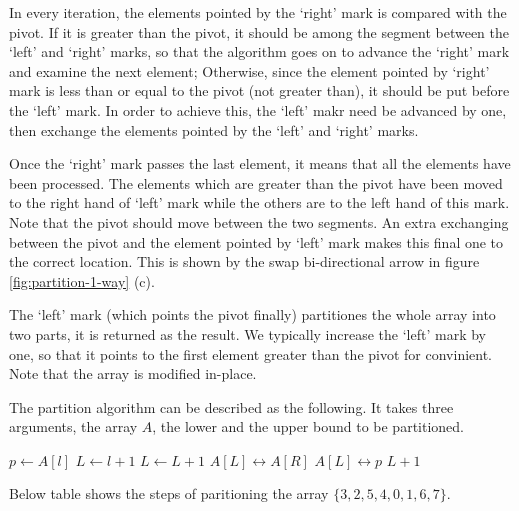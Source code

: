 \documentclass{article}
\begin{document}
In every iteration, the elements pointed by the `right' mark is compared with the
pivot. If it is greater than the pivot, it should be among the segment between the `left' and `right' marks, so that
the algorithm goes on to advance the `right' mark and examine the next element; Otherwise, since the element pointed
by `right' mark is less than or equal to the pivot (not greater than), it should be put before the `left' mark.
In order to achieve this, the `left' makr need be advanced by one, then exchange the elements pointed by the `left' 
and `right' marks.

Once the `right' mark passes the last element, it means that all the elements have been processed. The elements 
which are greater than the pivot have been moved to the right hand of `left' mark while the others are to the
left hand of this mark. Note that the pivot should move between the two segments. An extra exchanging between the pivot and
the element pointed by `left' mark makes this final one to the correct location. This is shown by the swap 
bi-directional arrow in figure \ref{fig:partition-1-way} (c).

The `left' mark (which points the pivot finally) partitiones the whole array into two parts, it is 
returned as the result. We typically increase the `left' mark by one, so that it points to the
first element greater than the pivot for convinient. Note that the array is modified in-place.

The partition algorithm can be described as the following. It takes three arguments, the array $A$, the lower
and the upper bound to be partitioned.

\begin{algorithmic}[1]
  \State $p \gets A[l]$  
  \State $L \gets l+1$ 
   
      \State $L \gets L + 1$
      \State {} $A[L] \leftrightarrow A[R]$
    \EndIf
    \State {} $A[L] \leftrightarrow p$
  \EndFor
  \State \Return $L + 1$ 
\EndFunction
\end{algorithmic}

Below table shows the steps of paritioning the array $\{ 3, 2, 5, 4, 0, 1, 6, 7\}$.
\end{document}
